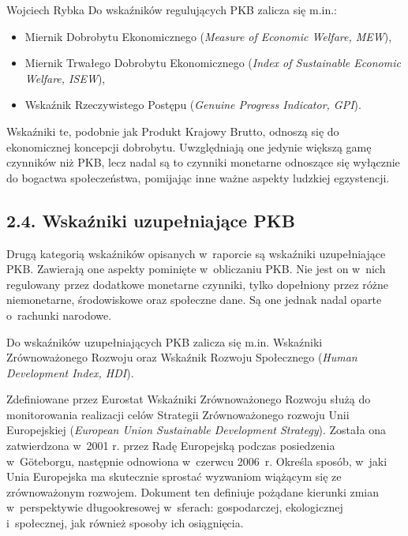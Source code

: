\begin{artplenv}{Wojciech Rybka}
Do wskaźników regulujących PKB zalicza się m.in.:

\begin{itemize}
\item Miernik Dobrobytu Ekonomicznego (\textit{Measure of Economic Welfare, MEW}),
\item Miernik Trwałego Dobrobytu Ekonomicznego (\textit{Index of Sustainable Economic Welfare, ISEW}),
\item Wskaźnik Rzeczywistego Postępu (\textit{Genuine Progress Indicator, GPI}).
\end{itemize}

Wskaźniki te, podobnie jak Produkt Krajowy Brutto, odnoszą się do ekonomicznej koncepcji dobrobytu. Uwzględniają one
jedynie większą gamę czynników niż PKB, lecz nadal są to czynniki monetarne odnoszące się wyłącznie do bogactwa
społeczeństwa, pomijając inne ważne aspekty ludzkiej egzystencji.

\subsection{2.4. Wskaźniki uzupełniające PKB}
Drugą kategorią wskaźników opisanych w~raporcie są wskaźniki uzupełniające PKB. Zawierają one aspekty
pominięte w~obliczaniu PKB. Nie jest on w~nich regulowany przez dodatkowe monetarne czynniki, tylko dopełniony przez różne
niemonetarne, środowiskowe oraz społeczne dane. Są one jednak nadal oparte o~rachunki narodowe.

Do wskaźników uzupełniających PKB zalicza się m.in. Wskaźniki Zrównoważonego Rozwoju oraz Wskaźnik Rozwoju Społecznego
(\textit{Human Development Index, HDI}).

Zdefiniowane przez Eurostat Wskaźniki Zrównoważonego Rozwoju służą do monitorowania realizacji celów Strategii
Zrównoważonego rozwoju Unii Europejskiej (\textit{European Union Sustainable Development Strategy}). Została ona
zatwierdzona w~2001 r. przez Radę Europejską podczas posiedzenia w~Göteborgu, następnie odnowiona w~czerwcu 2006~r.
Określa sposób, w~jaki Unia Europejska ma skutecznie sprostać wyzwaniom wiążącym się ze zrównoważonym rozwojem.
Dokument ten definiuje pożądane kierunki zmian w~perspektywie długookresowej w~sferach: gospodarczej,
ekologicznej i~społecznej, jak również sposoby ich osiągnięcia. 


\end{artplenv}
